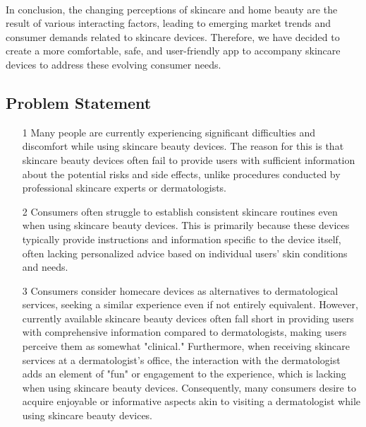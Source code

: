 \documentclass[conference]{IEEEtran}
\begin{document}
\\In conclusion, the changing perceptions of skincare and home beauty are the result of various interacting factors, leading to emerging market trends and consumer demands related to skincare devices. Therefore, we have decided to create a more comfortable, safe, and user-friendly app to accompany skincare devices to address these evolving consumer needs. \cite{kim2022skincare}


\subsection{Problem Statement}\label{SCM}
\begin{itemize}
\item [1] Many people are currently experiencing significant difficulties and discomfort while using skincare beauty devices. The reason for this is that skincare beauty devices often fail to provide users with sufficient information about the potential risks and side effects, unlike procedures conducted by professional skincare experts or dermatologists.\\ \cite{Song2022beautydevice}
\item [2] Consumers often struggle to establish consistent skincare routines even when using skincare beauty devices. This is primarily because these devices typically provide instructions and information specific to the device itself, often lacking personalized advice based on individual users' skin conditions and needs.\\
\item [3] Consumers consider homecare devices as alternatives to dermatological services, seeking a similar experience even if not entirely equivalent. However, currently available skincare beauty devices often fall short in providing users with comprehensive information compared to dermatologists, making users perceive them as somewhat "clinical." Furthermore, when receiving skincare services at a dermatologist's office, the interaction with the dermatologist adds an element of "fun" or engagement to the experience, which is lacking when using skincare beauty devices. Consequently, many consumers desire to acquire enjoyable or informative aspects akin to visiting a dermatologist while using skincare beauty devices.
\end{itemize}
\\
\\
\end{document}
